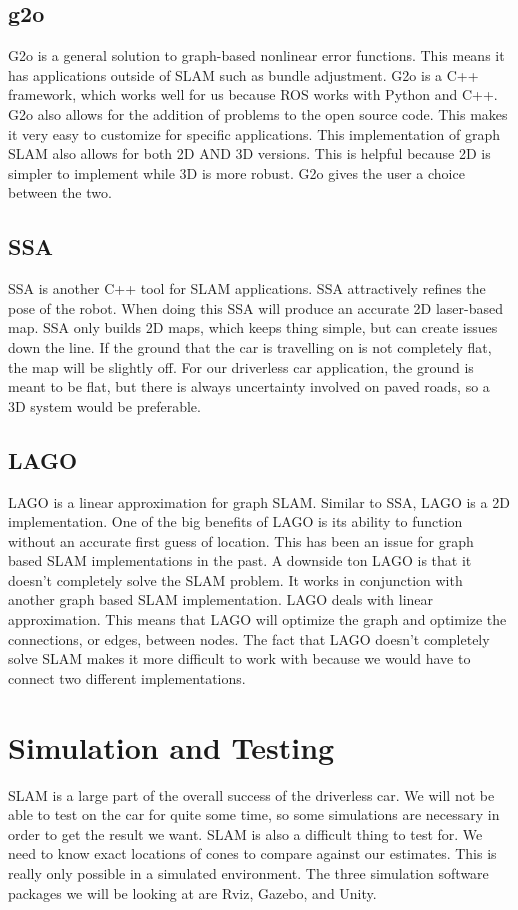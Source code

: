 \documentclass[10pt, onecolumn, draftclsnofoot, letterpaper,compsoc]{IEEEtran}
\begin{document}
\subsection{g2o}
G2o is a general solution to graph-based nonlinear error functions. This means it has applications outside of SLAM such as bundle adjustment. G2o is a C++ framework, which works well for us because ROS works with Python and C++. G2o also allows for the addition of problems to the open source code. This makes it very easy to customize for specific applications. This implementation of graph SLAM also allows for both 2D AND 3D versions. This is helpful because 2D is simpler to implement while 3D is more robust. G2o gives the user a choice between the two\citep{g2o}.

\subsection{SSA}
SSA is another C++ tool for SLAM applications. SSA attractively refines the pose of the robot. When doing this SSA will produce an accurate 2D laser-based map\citep{ssa}. SSA only builds 2D maps, which keeps thing simple, but can create issues down the line. If the ground that the car is travelling on is not completely flat, the map will be slightly off. For our driverless car application, the ground is meant to be flat, but there is always uncertainty involved on paved roads, so a 3D system would be preferable.

\subsection{LAGO}
LAGO is a linear approximation for graph SLAM. Similar to SSA, LAGO is a 2D implementation\citep{lago}. One of the big benefits of LAGO is its ability to function without an accurate first guess of location. This has been an issue for graph based SLAM implementations in the past. A downside ton LAGO is that it doesn't completely solve the SLAM problem. It works in conjunction with another graph based SLAM implementation. LAGO deals with linear approximation. This means that LAGO will optimize the graph and optimize the connections, or edges, between nodes. The fact that LAGO doesn't completely solve SLAM makes it more difficult to work with because we would have to connect two different implementations. 

\section{Simulation and Testing}
SLAM is a large part of the overall success of the driverless car. We will not be able to test on the car for quite some time, so some simulations are necessary in order to get the result we want. SLAM is also a difficult thing to test for. We need to know exact locations of cones to compare against our estimates. This is really only possible in a simulated environment. The three simulation software packages we will be looking at are Rviz, Gazebo, and Unity.
\end{document}
